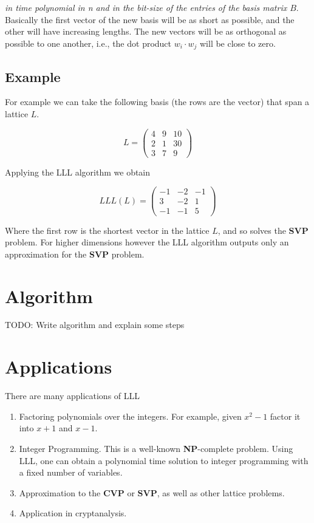 \documentclass[a4paper,12pt]{report}
\newcommand{\dd}{\cdot}
\begin{document}
\textit{in time polynomial in n and in the bit-size of the entries of the basis matrix $B$}.\\

Basically the first vector of the new basis will be as short as possible, and the other will have increasing lengths. The new vectors
will be as orthogonal as possible to one another, i.e., the dot product $w_i \dd w_j$ will be close to zero.

\subsection*{Example}

For example we can take the following basis (the rows are the vector) that span
a lattice $L$.

\[
L = 
\begin{pmatrix}
    4 & 9 & 10\\
    2 & 1 & 30\\ 
    3 & 7 & 9
\end{pmatrix}
\] 

Applying the LLL algorithm we obtain

\[
LLL(L) = 
\begin{pmatrix}
    -1 & -2 & -1\\
     3 & -2 &  1\\
    -1 & -1 &  5
\end{pmatrix}
\] 

Where the first row is the shortest vector in the lattice $L$, and so solves the \textbf{SVP} problem.
For higher dimensions however the LLL algorithm outputs only an approximation for the \textbf{SVP} problem.

\section{Algorithm}

TODO: Write algorithm and explain some steps

\section{Applications}

There are many applications of LLL

\begin{enumerate}
    \item Factoring polynomials over the integers. For example, given $x^2 - 1$ factor it into $x + 1$ and $x - 1$.
    \item Integer Programming. This is a well-known \textbf{NP}-complete problem. Using LLL, one can obtain a polynomial time solution
          to integer programming with a fixed number of variables.
    \item Approximation to the \textbf{CVP} or \textbf{SVP}, as well as other lattice problems.
    \item Application in cryptanalysis.
\end{enumerate}
\end{document}
